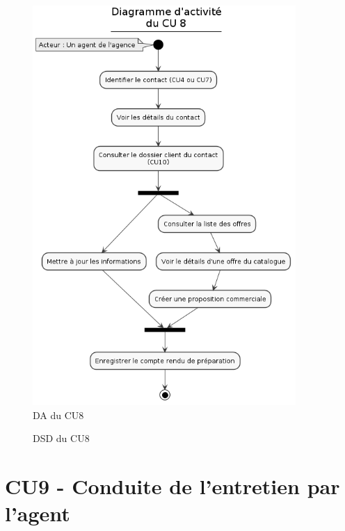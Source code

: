 \begin{figure}[H]
\centering
\includegraphics[width=10cm]{figures/DA_CU8.png}
\caption{DA du CU8}
\end{figure}

\begin{figure}[H]
\centering
\caption{DSD du CU8}
\end{figure}

\clearpage
\section{CU9 - Conduite de l’entretien par l’agent}

